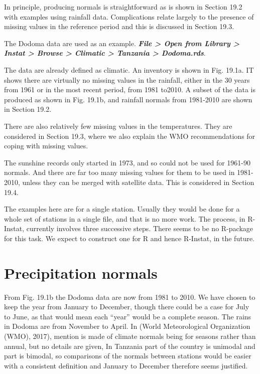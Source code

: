 \documentclass[
  letterpaper,
  DIV=11,
  numbers=noendperiod]{scrreprt}
\begin{document}
In principle, producing normals is straightforward as is shown in
Section 19.2 with examples using rainfall data. Complications relate
largely to the presence of missing values in the reference period and
this is discussed in Section 19.3.

The Dodoma data are used as an example. \textbf{\emph{File
\textgreater{} Open from Library \textgreater{} Instat \textgreater{}
Browse \textgreater{} Climatic \textgreater{} Tanzania \textgreater{}
Dodoma.rds}}.

The data are already defined as climatic. An inventory is shown in Fig.
19.1a. IT shows there are virtually no missing values in the rainfall,
either in the 30 years from 1961 or in the most recent period, from 1981
to2010. A subset of the data is produced as shown in Fig. 19.1b, and
rainfall normals from 1981-2010 are shown in Section 19.2.

There are also relatively few missing values in the temperatures. They
are considered in Section 19.3, where we also explain the WMO
recommendations for coping with missing values.

The sunshine records only started in 1973, and so could not be used for
1961-90 normals. And there are far too many missing values for them to
be used in 1981-2010, unless they can be merged with satellite data.
This is considered in Section 19.4.

The examples here are for a single station. Usually they would be done
for a whole set of stations in a single file, and that is no more work.
The process, in R-Instat, currently involves three successive steps.
There seems to be no R-package for this task. We expect to construct one
for R and hence R-Instat, in the future.

\section{Precipitation normals}\label{precipitation-normals}

From Fig. 19.1b the Dodoma data are now from 1981 to 2010. We have
chosen to keep the year from January to December, though there could be
a case for July to June, as that would mean each ``year'' would be a
complete season. The rains in Dodoma are from November to April. In
(World Meteorological Organization (WMO), 2017), mention is made of
climate normals being for seasons rather than annual, but no details are
given, In Tanzania part of the country is unimodal and part is bimodal,
so comparisons of the normals between stations would be easier with a
consistent definition and January to December therefore seems justified.
\end{document}
